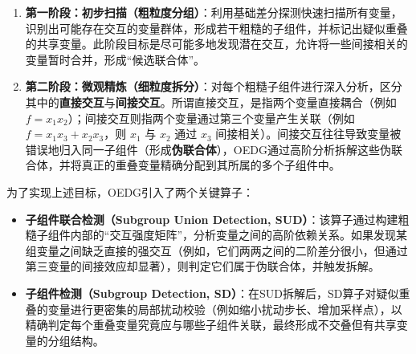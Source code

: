 \begin{enumerate}
    \item \textbf{第一阶段：初步扫描（粗粒度分组）}：利用基础差分探测快速扫描所有变量，识别出可能存在交互的变量群体，形成若干粗糙的子组件，并标记出疑似重叠的共享变量。此阶段目标是尽可能多地发现潜在交互，允许将一些间接相关的变量暂时合并，形成“候选联合体”。
    \item \textbf{第二阶段：微观精炼（细粒度拆分）}：对每个粗糙子组件进行深入分析，区分其中的\textbf{直接交互}与\textbf{间接交互}。所谓直接交互，是指两个变量直接耦合（例如 $f = x_1x_2$）；间接交互则指两个变量通过第三个变量产生关联（例如 $f = x_1x_3 + x_2x_3$，则 $x_1$ 与 $x_2$ 通过 $x_3$ 间接相关）。间接交互往往导致变量被错误地归入同一子组件（形成\textbf{伪联合体}），OEDG通过高阶分析拆解这些伪联合体，并将真正的重叠变量精确分配到其所属的多个子组件中。
\end{enumerate}

为了实现上述目标，OEDG引入了两个关键算子：
\begin{itemize}
    \item \textbf{子组件联合检测（Subgroup Union Detection, SUD）}：该算子通过构建粗糙子组件内部的“交互强度矩阵”，分析变量之间的高阶依赖关系。如果发现某组变量之间缺乏直接的强交互（例如，它们两两之间的二阶差分很小，但通过第三变量的间接效应却显著），则判定它们属于伪联合体，并触发拆解。
    \item \textbf{子组件检测（Subgroup Detection, SD）}：在SUD拆解后，SD算子对疑似重叠的变量进行更密集的局部扰动校验（例如缩小扰动步长、增加采样点），以精确判定每个重叠变量究竟应与哪些子组件关联，最终形成不交叠但有共享变量的分组结构。
\end{itemize}

